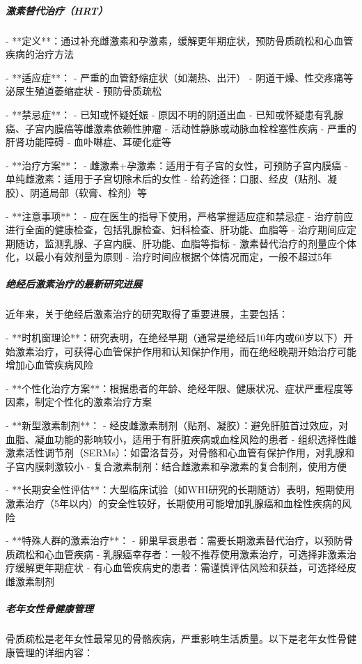 \begin{enumerate}
\subparagraph{激素替代治疗（HRT）}

- **定义**：通过补充雌激素和孕激素，缓解更年期症状，预防骨质疏松和心血管疾病的治疗方法

- **适应症**：
  - 严重的血管舒缩症状（如潮热、出汗）
  - 阴道干燥、性交疼痛等泌尿生殖道萎缩症状
  - 预防骨质疏松

- **禁忌症**：
  - 已知或怀疑妊娠
  - 原因不明的阴道出血
  - 已知或怀疑患有乳腺癌、子宫内膜癌等雌激素依赖性肿瘤
  - 活动性静脉或动脉血栓栓塞性疾病
  - 严重的肝肾功能障碍
  - 血卟啉症、耳硬化症等

- **治疗方案**：
  - 雌激素+孕激素：适用于有子宫的女性，可预防子宫内膜癌
  - 单纯雌激素：适用于子宫切除术后的女性
  - 给药途径：口服、经皮（贴剂、凝胶）、阴道局部（软膏、栓剂）等

- **注意事项**：
  - 应在医生的指导下使用，严格掌握适应症和禁忌症
  - 治疗前应进行全面的健康检查，包括乳腺检查、妇科检查、肝功能、血脂等
  - 治疗期间应定期随访，监测乳腺、子宫内膜、肝功能、血脂等指标
  - 激素替代治疗的剂量应个体化，以最小有效剂量为原则
  - 治疗时间应根据个体情况而定，一般不超过5年

\subparagraph{绝经后激素治疗的最新研究进展}

近年来，关于绝经后激素治疗的研究取得了重要进展，主要包括：

- **时机窗理论**：研究表明，在绝经早期（通常是绝经后10年内或60岁以下）开始激素治疗，可获得心血管保护作用和认知保护作用，而在绝经晚期开始治疗可能增加心血管疾病风险

- **个性化治疗方案**：根据患者的年龄、绝经年限、健康状况、症状严重程度等因素，制定个性化的激素治疗方案

- **新型激素制剂**：
  - 经皮雌激素制剂（贴剂、凝胶）：避免肝脏首过效应，对血脂、凝血功能的影响较小，适用于有肝脏疾病或血栓风险的患者
  - 组织选择性雌激素活性调节剂（SERMs）：如雷洛昔芬，对骨骼和心血管有保护作用，对乳腺和子宫内膜刺激较小
  - 复合激素制剂：结合雌激素和孕激素的复合制剂，使用方便

- **长期安全性评估**：大型临床试验（如WHI研究的长期随访）表明，短期使用激素治疗（5年以内）的安全性较好，长期使用可能增加乳腺癌和血栓性疾病的风险

- **特殊人群的激素治疗**：
  - 卵巢早衰患者：需要长期激素替代治疗，以预防骨质疏松和心血管疾病
  - 乳腺癌幸存者：一般不推荐使用激素治疗，可选择非激素治疗缓解更年期症状
  - 有心血管疾病史的患者：需谨慎评估风险和获益，可选择经皮雌激素制剂

\subparagraph{老年女性骨健康管理}

骨质疏松是老年女性最常见的骨骼疾病，严重影响生活质量。以下是老年女性骨健康管理的详细内容：


\end{enumerate}
